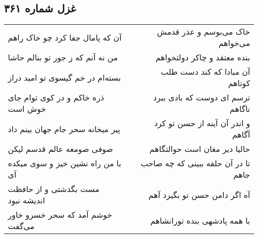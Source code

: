 \begin{center}
\section*{غزل شماره ۳۶۱}
\label{sec:sh361}
\begin{longtable}{l p{0.5cm} r}
آن که پامال جفا کرد چو خاک راهم
&&
خاک می‌بوسم و عذر قدمش می‌خواهم
\\
من نه آنم که ز جور تو بنالم حاشا
&&
بنده معتقد و چاکر دولتخواهم
\\
بسته‌ام در خم گیسوی تو امید دراز
&&
آن مبادا که کند دست طلب کوتاهم
\\
ذره خاکم و در کوی توام جای خوش است
&&
ترسم ای دوست که بادی ببرد ناگاهم
\\
پیر میخانه سحر جام جهان بینم داد
&&
و اندر آن آینه از حسن تو کرد آگاهم
\\
صوفی صومعه عالم قدسم لیکن
&&
حالیا دیر مغان است حوالتگاهم
\\
با من راه نشین خیز و سوی میکده آی
&&
تا در آن حلقه ببینی که چه صاحب جاهم
\\
مست بگذشتی و از حافظت اندیشه نبود
&&
آه اگر دامن حسن تو بگیرد آهم
\\
خوشم آمد که سحر خسرو خاور می‌گفت
&&
با همه پادشهی بنده تورانشاهم
\\
\end{longtable}
\end{center}
